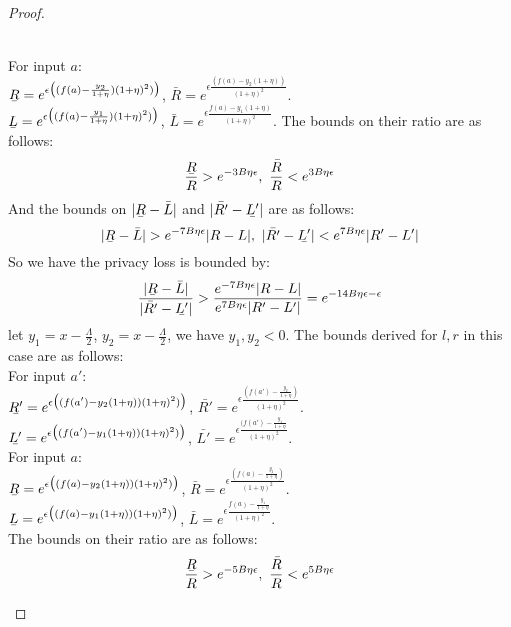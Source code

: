 \documentclass[a4paper,11pt]{article}
\begin{document}
\begin{proof}
\begin{itemize}
		\\
		For input $a$:
		\\
		$\ubar{R} = e^{\epsilon 
				\big( (f(a) - \frac{y_2}{1 + \eta}) (1 + \eta)^2) \big)}$, 
		$\bar{R} = e^{\epsilon 
				\frac{(f(a) - y_2(1 + \eta))}{(1 + \eta)^2}}$.  
		\\
		$\ubar{L} = e^{\epsilon 
				\big( (f(a) - \frac{y_1}{1 + \eta}) (1 + \eta)^2) \big)}$, 
		$\bar{L} = e^{\epsilon 
				\frac{f(a) - y_1(1 + \eta)}{(1 + \eta)^2}}$.
		The bounds on their ratio are as follows:
		\[
		\frac{\ubar{R}}{R} > e^{-3B\eta \epsilon}, 
		~ \frac{\bar{R}}{R} < e^{3B\eta \epsilon}
		\]
		And the bounds on $|\ubar{R} - \bar{L}|$ and $|\bar{R'} - \ubar{L'}|$ are as follows:
		\[
		|\ubar{R} - \bar{L}| > e^{-7 B\eta \epsilon}|R - L|, 
		~ |\bar{R'} - \ubar{L'}| < e^{7 B\eta \epsilon}|R' - L'|
		\]
		So we have the privacy loss is bounded by:
		\[
		\frac{|\ubar{R} - \bar{L}|}{|\bar{R'} - \ubar{L'}|}
		> \frac{e^{-7 B\eta \epsilon}|R - L|}{e^{7 B\eta \epsilon}|R' - L'|}
		= e^{-14B \eta \epsilon - \epsilon}
		\]
		let $y_1 = x - \frac{\Lambda}{2}$, $y_2 = x - \frac{\Lambda}{2}$, we have $y_1, y_2 < 0$. The bounds derived for $l, r$ in this case are as follows:
		\\
		For input $a'$:
		\\
		$\ubar{R'} = e^{\epsilon 
				\big( (f(a') - y_2(1 + \eta)) (1 + \eta)^2) \big)}$, 
		$\bar{R'} = e^{\epsilon 
				\frac{(f(a') - \frac{y_2}{1 + \eta})}{(1 + \eta)^2}}$.
		\\
		$\ubar{L'} = e^{\epsilon 
				\big( (f(a') - y_1(1 + \eta) ) (1 + \eta)^2) \big)}$,
		$\bar{L'} = e^{\epsilon 
				\frac{(f(a') - \frac{y_1}{1 + \eta}}{(1 + \eta)^2}}$.
		\\
		For input $a$:
		\\
		$\ubar{R} = e^{\epsilon 
				\big( (f(a) - y_2(1 + \eta)) (1 + \eta)^2) \big)}$, 
		$\bar{R} = e^{\epsilon 
				\frac{(f(a) - \frac{y_2}{1 + \eta})}{(1 + \eta)^2}}$.  
		\\
		$\ubar{L} = e^{\epsilon 
				\big( (f(a) - y_1(1 + \eta)) (1 + \eta)^2) \big)}$, 
		$\bar{L} = e^{\epsilon 
				\frac{f(a) - \frac{y_1}{1 + \eta}}{(1 + \eta)^2}}$.
		\\
		The bounds on their ratio are as follows:
		\[
		\frac{\ubar{R}}{R} > e^{-5B\eta \epsilon}, 
		~ \frac{\bar{R}}{R} < e^{5B\eta \epsilon}
\]
\end{itemize}
\end{proof}
\end{document}
